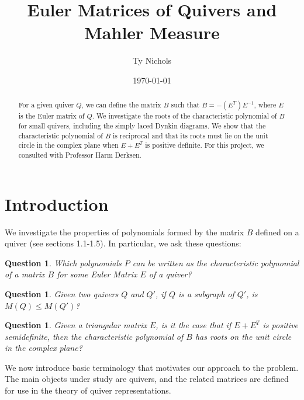 \documentclass{amsart}
\theoremstyle{theorem}
\theoremstyle{theorem*}
\newtheorem{question}[theorem]{Question}
\theoremstyle{definition}
\begin{document}
\date{\today}
\title[Euler Matrices and Mahler Measure] {Euler Matrices of Quivers and Mahler Measure}
\author[T. Nichols]{Ty Nichols}
\address{Department of Mathematics, Northeastern University, Boston,
    Massachusetts~02115}
\begin{abstract} For a given quiver $Q$, we can define the matrix $B$ such that
    $B = -(E^T)E^{-1}$, where $E$ is the Euler matrix of $Q$. We investigate
    the roots of the characteristic polynomial of $B$ for
    small quivers, including the simply laced Dynkin diagrams. We show that 
    the characteristic polynomial of $B$ is reciprocal and that its roots must
    lie on the unit circle in the complex plane when $E + E^T$ is positive definite.
    For this project, we consulted with Professor Harm Derksen. 
\end{abstract}
\maketitle

\section{Introduction}

We investigate the properties of polynomials formed by the matrix $B$ defined
on a quiver (see sections 1.1-1.5). In particular, we ask these questions:

\begin{question}
    Which polynomials $P$ can be written as the characteristic polynomial of a 
    matrix $B$ for some Euler Matrix $E$ of a quiver?
\end{question}

\begin{question}
    Given two quivers $Q$ and $Q'$, if $Q$ is a subgraph of $Q'$, is $M(Q) \leq
        M(Q')$?
\end{question}

\begin{question}
    Given a triangular matrix $E$, is it the case that if $E + E^T$ is positive semidefinite,
    then the characteristic polynomial of $B$ has roots on the unit circle in the complex plane?
\end{question}

We now introduce basic terminology that motivates our approach to the
problem. The main objects under study are quivers, and the related matrices are
defined for use in the theory of quiver representations.
\end{document}
